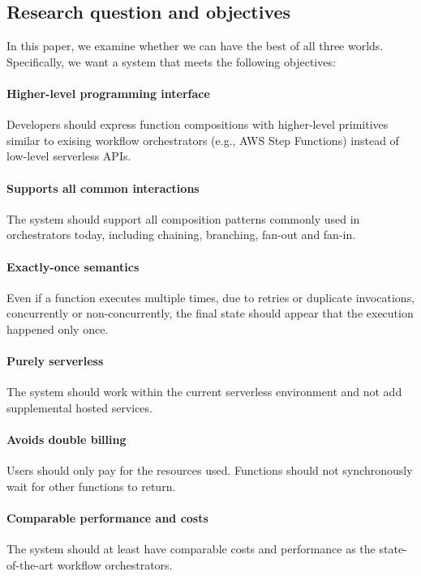\subsection{Research question and objectives}

In this paper, we examine whether we can have the best of all three worlds. Specifically, we want a system that meets the following objectives:

\paragraph{Higher-level programming interface} Developers should express
function compositions with higher-level primitives similar to exising workflow
orchestrators (e.g., AWS Step Functions) instead of low-level serverless APIs.

\paragraph{Supports all common interactions} The system should support all
composition patterns commonly used in orchestrators today, including chaining,
branching, fan-out and fan-in.

\paragraph{Exactly-once semantics} Even if a function executes multiple times,
due to retries or duplicate invocations, concurrently or non-concurrently, the
final state should appear that the execution happened only once.

\paragraph{Purely serverless} The system should work within the current
serverless environment and not add supplemental hosted services.

\paragraph{Avoids double billing} Users should only pay for the resources
used. Functions should not synchronously wait for other functions to return.

\paragraph{Comparable performance and costs} The system should at least have
comparable costs and performance as the state-of-the-art workflow
orchestrators.




